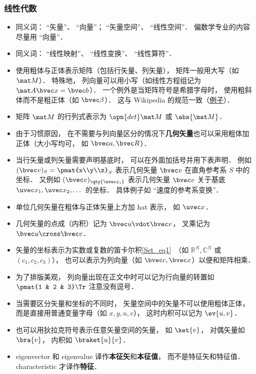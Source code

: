 \subsubsection{线性代数}
\begin{itemize}
\item 同义词： “矢量”、 “向量”； “矢量空间”、 “线性空间”． 偏数学专业的内容尽量用 “向量”．
\item 同义词： “线性映射”、 “线性变换”、 “线性算符”．
\item 使用粗体与正体表示矩阵（包括行矢量、列矢量）， 矩阵一般用大写（如 $\mat M$）． 特殊地， 列向量可以用小写（如线性方程组记为 $\mat A \bvec x = \bvec b$）． 一个例外是当矩阵符号是希腊字母时， 使用粗斜体而不是粗正体（如 $\bvec \beta$）． 这与 Wikipedia 的规范一致（\href{https://en.wikipedia.org/wiki/Angular_acceleration}{例子}）．
\item 矩阵 $\mat M$ 的行列式表示为 $\opn{det}\mat M$ 或 $\abs{\mat M}$．
\item 由于习惯原因， 在不需要与列向量区分的情况下\textbf{几何矢量}也可以采用粗体加正体（大小写均可， 如 $\bvec a, \bvec R$）．
\item 当行矢量或列矢量需要声明基底时， 可以在外面加括号并用下表声明． 例如 $(\bvec v)_S = \pmat{x\\y\\z}_S$ 表示几何矢量 $\bvec v$ 在直角参考系 $S$ 中的坐标． 又例如 $(\bvec v)_{\qty{\uvec x_i}}$ 表示几何矢量 $\bvec v$ 关于基底 $\uvec x_1, \uvec x_2, \dots$ 的坐标． 具体例子如 “速度的参考系变换”．
\item 单位几何矢量在粗体与正体矢量上方加 hat 表示， 如 $\uvec x$．
\item 几何矢量的点成（内积）记为 $\bvec u \vdot \bvec v$， 叉乘记为 $\bvec u \cross \bvec v$．
\item 矢量的坐标表示为实数或复数的笛卡尔积\autoref{Set_eq1}~（如 $\mathbb R^N, \mathbb C^N$ 或 $(c_1, c_2, c_3)$）， 也可以表示为列向量（如 $\bvec c, \bvec x$）以便和矩阵相乘．
\item 为了排版美观， 列向量出现在正文中时可以记为行向量的转置如 $\pmat{1 & 2 & 3}\Tr$ 注意没有逗号．
\item 当需要区分矢量和坐标的不同时， 矢量空间中的矢量不可以使用粗体正体， 而是直接用普通变量字母（如 $x, y, u, v$）， 这时内积可以记为 $\ev{u, v}$．
\item 也可以用狄拉克符号表示任意矢量空间的矢量， 如 $\ket{v}$， 对偶矢量如 $\bra{v}$， 内积如 $\braket{u}{v}$．
\item eigenvector 和 eigenvalue 译作\textbf{本征矢}和\textbf{本征值}， 而不是特征矢和特征值． characteristic 才译作\textbf{特征}．
\end{itemize}

